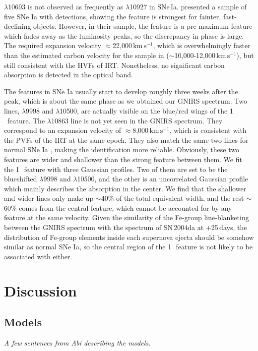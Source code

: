 \documentclass[twocolumn]{aastex631}
\newcommand{\kms}{$\mathrm{km}\,\mathrm{s}^{-1}$}
\begin{document}
 $\lambda$10693 is not observed as frequently as  $\lambda$10927 in SNe\,Ia. \citet{Hsiao_CSP_2019} presented a sample of five SNe Ia with  detections, showing the  feature is strongest for fainter, fast-declining objects. However, in their sample, the  feature is a pre-maximum feature which fades away as the luminosity peaks, so the discrepancy in phase is large. The required expansion velocity $\approx$22,000\,\kms, which is overwhelmingly faster than the estimated carbon velocity for the sample in \citet{Hsiao_CSP_2019} ($\sim$10,000-12,000\,\kms), but still consistent with the HVFs of  IRT. Nonetheless, no significant carbon absorption is detected in the optical band.

The  features in SNe Ia usually start to develop roughly three weeks after the peak, which is about the same phase as we obtained our GNIRS spectrum. Two  lines, $\lambda$9998 and $\lambda$10500, are actually visible on the blue/red wings of the 1\,\micron\ feature. The  $\lambda$10863 line is not yet seen in the GNIRS spectrum. They correspond to an expansion velocity of $\approx$8,000\,\kms, which is consistent with the PVFs of the  IRT at the same epoch. They also match the same two lines for normal SNe Ia \citep{Marion2009_NIR}, making the identification more reliable. Obviously, these two  features are wider and shallower than the strong feature between them. We fit the 1\,\micron\ feature with three Gaussian profiles. Two of them are set to be the blueshifted  $\lambda$9998 and $\lambda$10500, and the other is an uncorrelated Gaussian profile which mainly describes the absorption in the center. We find that the shallower and wider  lines only make up $\sim$40\% of the total equivalent width, and the rest $\sim$60\% comes from the central feature, which cannot be accounted for by any  feature at the same velocity. Given the similarity of the Fe-group line-blanketing between the GNIRS spectrum with the spectrum of SN\,2004da at +25\,days, the distribution of Fe-group elements inside each supernova ejecta should be somehow similar as normal SNe Ia, so the central region of the 1\,\micron\ feature is not likely to be associated with  either.


\section{Discussion} \label{sec:discussion}
\subsection{Models} \label{sec:model}
{\it A few sentences from Abi describing the models.}
\end{document}
